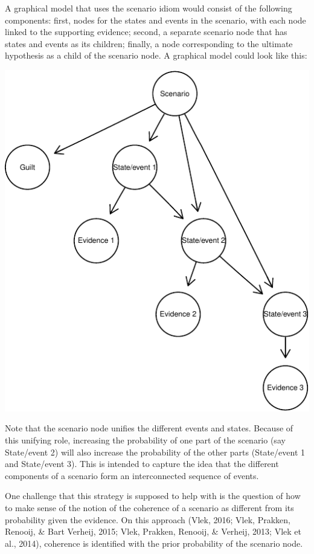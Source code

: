 \documentclass[11pt,dvipsnames,enabledeprecatedfontcommands]{scrartcl}
\begin{document}
A graphical model that uses the scenario idiom would consist of the
following components: first, nodes for the states and events in the
scenario, with each node linked to the supporting evidence; second, a
separate scenario node that has states and events as its children;
finally, a node corresponding to the ultimate hypothesis as a child of
the scenario node. A graphical model could look like this:

\begin{center}\includegraphics{BNfiles/unnamed-chunk-13-1} \end{center}

\noindent
 Note that the scenario node unifies the different events and states.
Because of this unifying role, increasing the probability of one part of
the scenario (say \textsf{State/event 2}) will also increase the
probability of the other parts (\textsf{State/event 1} and
\textsf{State/event 3}). This is intended to capture the idea that the
different components of a scenario form an interconnected sequence of
events.

One challenge that this strategy is supposed to help with is the
question of how to make sense of the notion of the coherence of a
scenario as different from its probability given the evidence. On this
approach (Vlek, 2016; Vlek, Prakken, Renooij, \& Bart Verheij, 2015;
Vlek, Prakken, Renooij, \& Verheij, 2013; Vlek et al., 2014), coherence
is identified with the prior probability of the scenario node.
\end{document}
